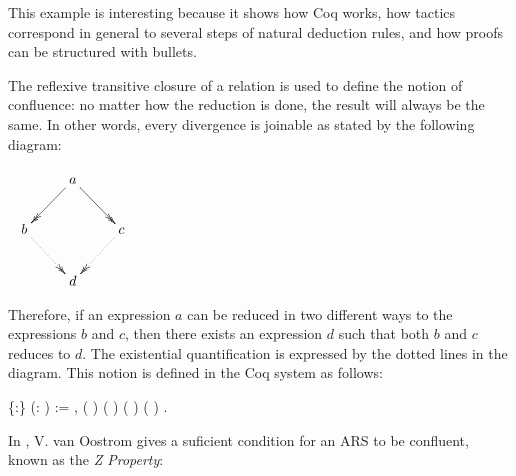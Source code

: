 This example is interesting because it shows how Coq works, how
tactics correspond in general to several steps of natural deduction
rules, and how proofs can be structured with bullets. \begin{coqdoccode}
\coqdocemptyline
\coqdocemptyline
\end{coqdoccode}
The reflexive transitive closure of a relation is used to define
    the notion of confluence: no matter how the reduction is done, the
    result will always be the same. In other words, every divergence
    is joinable as stated by the following diagram:


    $\begin{tabular}{c} \xymatrix{ & a \ar@{->>}[dl] \ar@{->>}[dr] &
    \\ b \ar@{.>>}[dr] & & c \ar@{.>>}[dl] \\ & d & } \end{tabular}$


    Therefore, if an expression $a$ can be reduced in two different
    ways to the expressions $b$ and $c$, then there exists an
    expression $d$ such that both $b$ and $c$ reduces to $d$. The
    existential quantification is expressed by the dotted lines in the
    diagram. This notion is defined in the Coq system as follows: \begin{coqdoccode}
\coqdocemptyline
\coqdocnoindent
{}  \{:\} (:  ) := \coqdockw{\ensuremath{\forall}}   , ( )    ( )      ( )    ( )  .\coqdoceol
\coqdocemptyline
\end{coqdoccode}
In \cite{ZPropertyDraft}, V. van Oostrom gives a suficient
    condition for an ARS to be confluent, known as the \textit{Z Property}:


